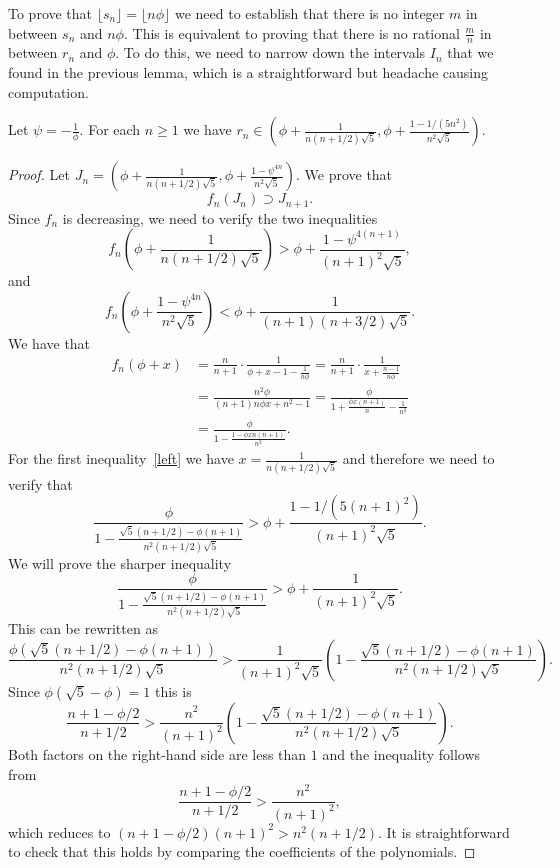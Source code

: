 \documentclass[12pt,reqno]{article}
\begin{document}
To prove that $\lfloor s_n\rfloor =\lfloor n\phi\rfloor$ we need to establish that there
is no integer $m$ in between $s_n$ and $n\phi$. This is equivalent to proving that there
is no rational $\frac mn$ in between $r_n$ and $\phi$. To do this, we need to narrow down the
intervals $I_n$ that we found in the previous lemma, which is a straightforward but headache
causing computation. 

\begin{lemma}\label{lem:estimate}
Let $\psi=-\frac {1}{\phi}$.
For each $n\geq 1$ we have $r_n\in \left(\phi+\frac{1}{n(n+1/2)\sqrt 5},\phi+\frac{1-1/{(5n^2)}}{n^2\sqrt 5}\right)$.
\end{lemma}
\begin{proof}
    Let $J_n=\left(\phi+\frac{1}{n(n+1/2)\sqrt 5},\phi+\frac{1-\psi^{4n}}{n^2\sqrt 5}\right)$. We prove that \[f_n(J_n)\supset J_{n+1}.\] Since $f_n$ is decreasing, we need to verify the two inequalities
    \begin{equation}\label{left}
    f_n\left(\phi+\frac{1}{n(n+1/2)\sqrt 5}\right)>\phi+\frac{1-\psi^{4(n+1)}}{(n+1)^2\sqrt 5},        
    \end{equation}
    and
    \begin{equation}\label{right}
    f_n\left(\phi+\frac{1-\psi^{4n}}{n^2\sqrt 5}\right)<\phi+\frac{1}{(n+1)(n+3/2)\sqrt 5}.
    \end{equation}
    We have that 
\begin{align*}
f_n(\phi + x) &= \frac{n}{n+1} \cdot \frac{1}{\phi + x - 1 - \frac{1}{n\phi}} 
= \frac{n}{n+1} \cdot \frac{1}{x + \frac{n-1}{n\phi}} \\
&= \frac{n^2\phi}{(n+1) n \phi x + n^2 - 1} 
= \frac{\phi}{1 + \frac{\phi x (n+1)}{n} - \frac{1}{n^2}}\\
&=\frac{\phi}{1 - \frac{1-\phi x n(n+1)}{n^2}}.
\end{align*}
    For the first inequality~\ref{left} we have $x=\frac{1}{n(n+1/2)\sqrt 5}$ and therefore we need to verify that
    \[
    \frac{\phi}{1-\frac {\sqrt 5(n+1/2) -\phi(n+1)}{n^2(n+1/2)\sqrt 5}}>\phi+\frac{1-1/(5(n+1)^2)}{(n+1)^2\sqrt 5}.
    \]
    We will prove the sharper inequality
    \[
    \frac{\phi}{1-\frac {\sqrt 5(n+1/2) -\phi(n+1)}{n^2(n+1/2)\sqrt 5}}>\phi+\frac{1}{(n+1)^2\sqrt 5}.
    \]
    This can be rewritten as
    \[
    \frac {\phi(\sqrt 5(n+1/2) -\phi(n+1))}{n^2(n+1/2)\sqrt 5}>\frac{1}{(n+1)^2\sqrt 5}\left(1-\frac {\sqrt 5(n+1/2) -\phi(n+1)}{n^2(n+1/2)\sqrt 5}\right).
    \] 
    Since $\phi(\sqrt 5 -\phi)=1$ this is
    \[
    \frac{n+1-\phi/2}{n+1/2}>\frac{n^2}{(n+1)^2}\left(1-\frac {\sqrt 5(n+1/2) -\phi(n+1)}{n^2(n+1/2)\sqrt 5}\right).
    \]
    Both factors on the right-hand side are less than $1$ and the inequality follows from
    \[
    \frac{n+1-\phi/2}{n+1/2}>\frac{n^2}{(n+1)^2},
    \]
    which reduces to $(n+1-\phi/2)(n+1)^2>n^2(n+1/2)$. It is straightforward to check that this holds
    by comparing the coefficients of the polynomials.
    

\end{proof}
\end{document}
